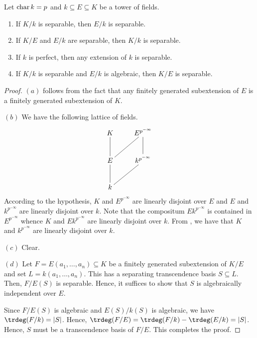 \begin{theorem}
    Let $\operatorname{char} k = p$ and $k\subseteq E\subseteq K$ be a tower of fields. 
    \begin{enumerate}[label=(\alph*)]
        \item If $K/k$ is separable, then $E/k$ is separable. 
        \item If $K/E$ and $E/k$ are separable, then $K/k$ is separable. 
        \item If $k$ is perfect, then any extension of $k$ is separable. 
        \item If $K/k$ is separable and $E/k$ is algebraic, then $K/E$ is separable.
    \end{enumerate}
\end{theorem}
\begin{proof}
    $(a)$ follows from the fact that any finitely generated subextension of $E$ is a finitely generated subextension of $K$.

    $(b)$ We have the following lattice of fields. 
    \begin{equation*}
        \xymatrix {
            K & E^{p^{-\infty}}\ar@{-}[d]\\
            E\ar@{-}[u]\ar@{-}[ru] & k^{p^{-\infty}}\\
            k\ar@{-}[ru]\ar@{-}[u] & 
        }
    \end{equation*}
    According to the hypothesis, $K$ and $E^{p^{-\infty}}$ are linearly disjoint over $E$ and $E$ and $k^{p^{-\infty}}$ are linearly disjoint over $k$. Note that the compositum $Ek^{p^{-\infty}}$ is contained in $E^{p^{-\infty}}$ whence $K$ and $Ek^{p^{-\infty}}$ are linearly disjoint over $k$. From , we have that $K$ and $k^{p^{-\infty}}$ are linearly disjoint over $k$.

    $(c)$ Clear.

    $(d)$ Let $F = E(a_1,\dots,a_n)\subseteq K$ be a finitely generated subextension of $K/E$ and set $L = k(a_1,\dots,a_n)$. This has a separating transcendence basis $S\subseteq L$. Then, $F/E(S)$ is separable. Hence, it suffices to show that $S$ is algebraically independent over $E$. 

    Since $F/E(S)$ is algebraic and $E(S)/k(S)$ is algebraic, we have $\trdeg(F/k) = |S|$. Hence, $\trdeg(F/E) = \trdeg(F/k) - \trdeg(E/k) = |S|$. Hence, $S$ must be a transcendence basis of $F/E$. This completes the proof.
\end{proof}